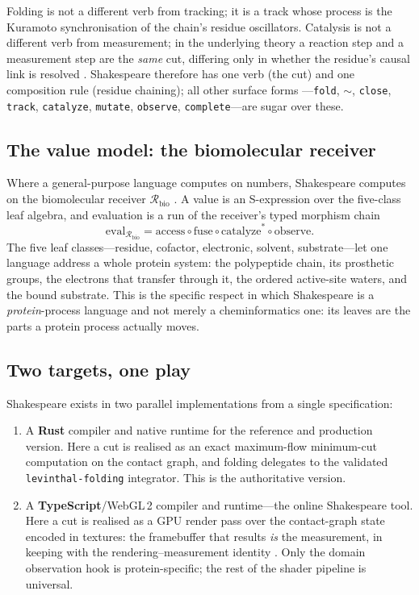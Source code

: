 \documentclass[11pt,a4paper]{article}
\theoremstyle{thmstyle}
\theoremstyle{definition}
\theoremstyle{remark}
\newcommand{\Recv}{\mathcal{R}_{\mathrm{bio}}}
\newcommand{\eval}{\mathrm{eval}}
\newcommand{\shk}[1]{\texttt{#1}}
\begin{document}
Folding is not a different verb from tracking; it is a track whose process
is the Kuramoto synchronisation of the chain's residue oscillators.
Catalysis is not a different verb from measurement; in the underlying
theory a reaction step and a measurement step are the \emph{same} cut,
differing only in whether the residue's causal link is resolved
\citep{sachikonye2025causal}. Shakespeare therefore has one verb (the cut)
and one composition rule (residue chaining); all other surface forms
---\shk{fold}, \shk{$\sim$}, \shk{close}, \shk{track}, \shk{catalyze},
\shk{mutate}, \shk{observe}, \shk{complete}---are sugar over these.

\subsection{The value model: the biomolecular receiver}

Where a general-purpose language computes on numbers, Shakespeare computes
on the biomolecular receiver $\Recv$ \citep{sachikonye2025expralg}. A
value is an S-expression over the five-class leaf algebra, and evaluation
is a run of the receiver's typed morphism chain
\begin{equation}
\eval_{\Recv}
= \mathrm{access}\circ\mathrm{fuse}\circ\mathrm{catalyze}^{*}
  \circ\mathrm{observe}.
\label{eq:chain-intro}
\end{equation}
The five leaf classes---residue, cofactor, electronic, solvent,
substrate---let one language address a whole protein system: the
polypeptide chain, its prosthetic groups, the electrons that transfer
through it, the ordered active-site waters, and the bound substrate. This
is the specific respect in which Shakespeare is a \emph{protein}-process
language and not merely a cheminformatics one: its leaves are the parts a
protein process actually moves.

\subsection{Two targets, one play}

Shakespeare exists in two parallel implementations from a single
specification:

\begin{enumerate}[leftmargin=1.6em,itemsep=2pt]
\item A \textbf{Rust} compiler and native runtime for the reference and
production version. Here a cut is realised as an exact maximum-flow
minimum-cut computation on the contact graph, and folding delegates to the
validated \shk{levinthal-folding} integrator. This is the authoritative
version.
\item A \textbf{TypeScript}/WebGL\,2 compiler and runtime---the online
Shakespeare tool. Here a cut is realised as a GPU render pass over the
contact-graph state encoded in textures: the framebuffer that results
\emph{is} the measurement, in keeping with the rendering--measurement
identity \citep{sachikonye2025sbs}. Only the domain observation hook is
protein-specific; the rest of the shader pipeline is universal.
\end{enumerate}
\end{document}
